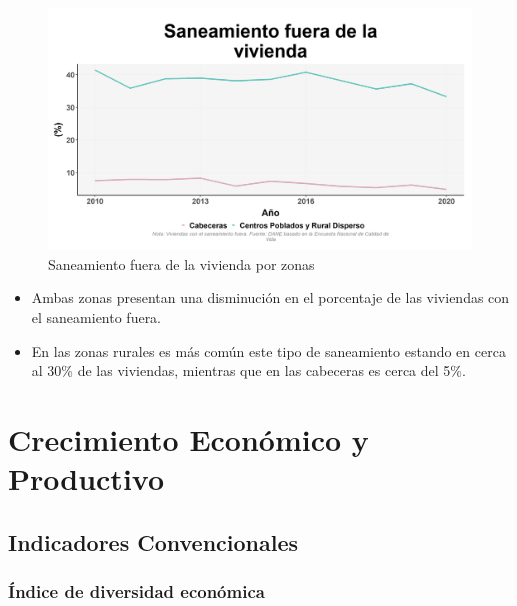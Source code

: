     \begin{figure}[H]
        \caption{Saneamiento fuera de la vivienda por zonas \label{map_result_2} }
        \begin{center}
        \includegraphics[width=\textwidth,keepaspectratio]{img/var_196_trend.png}
        \end{center}
    \end{figure}
            \begin{itemize}
                    \item Ambas zonas presentan una disminución en el porcentaje de las viviendas con el saneamiento fuera.
                    \item En las zonas rurales es más común este tipo de saneamiento estando en cerca al 30\% de las viviendas, mientras que en las cabeceras es cerca del 5\%.
                    \end{itemize}

\section{Crecimiento Económico y Productivo}
    \subsection{Indicadores Convencionales}
        \subsubsection{Índice de diversidad económica}

